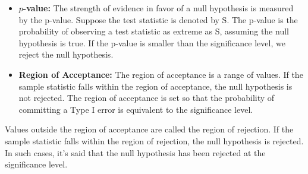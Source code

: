 \begin{itemize}
 \item \textbf{$p$-value:} The strength of evidence in favor of a null hypothesis is measured by the p-value. Suppose the test statistic is denoted by S. The p-value is the probability of observing a test statistic as extreme as S, assuming the null hypothesis is true. If the p-value is smaller than the significance level, we reject the null hypothesis.
 \item \textbf{Region of Acceptance:} The region of acceptance is a range of values. If the sample statistic falls within the region of acceptance, the null hypothesis is not rejected. The region of acceptance is set so that the probability of committing a Type I error is equivalent to the significance level.
\end{itemize}

Values outside the region of acceptance are called the region of rejection. If the sample statistic falls within the region of rejection, the null hypothesis is rejected. In such cases, it's said that the null hypothesis has been rejected at the  significance level.




